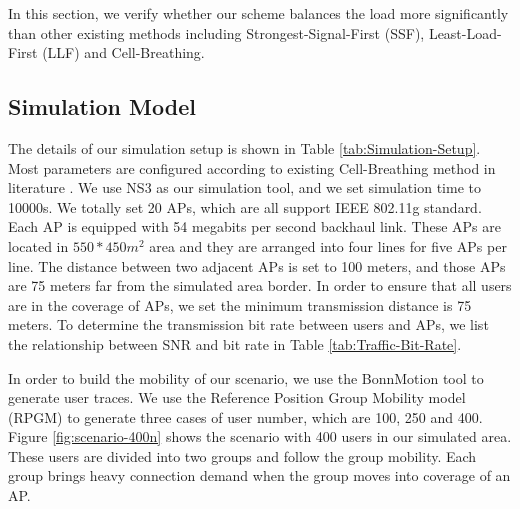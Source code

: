In this section, we verify whether our scheme balances the load more significantly than other existing methods including Strongest-Signal-First (SSF), Least-Load-First (LLF) and Cell-Breathing.

\subsection{Simulation Model}
The details of our simulation setup is shown in Table \ref{tab:Simulation-Setup}. Most parameters are configured according to existing Cell-Breathing method in literature \cite{bejerano2009cell}. We use NS3 as our simulation tool, and we set simulation time to 10000s. We totally set 20 APs, which are all support IEEE 802.11g standard. Each AP is equipped with 54 megabits per second backhaul link. These APs are located in $550 * 450 m^2$ area and they are arranged into four lines for five APs per line. The distance between two adjacent APs is set to 100 meters, and those APs are 75 meters far from the simulated area border. In order to ensure that all users are in the coverage of APs, we set the minimum transmission distance is 75 meters. To determine the transmission bit rate between users and APs, we list the relationship between SNR and bit rate in Table \ref{tab:Traffic-Bit-Rate}.

In order to build the mobility of our scenario, we use the BonnMotion tool to generate user traces. We use the Reference Position Group Mobility model (RPGM) to generate three cases of user number, which are 100, 250 and 400. Figure \ref{fig:scenario-400n} shows the scenario with 400 users in our simulated area. These users are divided into two groups and follow the group mobility. Each group brings heavy connection demand when the group moves into coverage of an AP.

